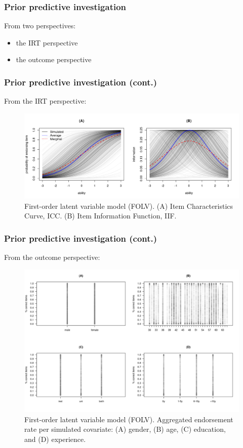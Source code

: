\documentclass[nonav,sleutel]{beamer}
\begin{document}
	\begin{frame}
		\frametitle{Prior predictive investigation}
		From two perspectives:
		\begin{itemize}
			\item the IRT perspective
			\item the outcome perspective
		\end{itemize}
	\end{frame}
	\begin{frame}
		\frametitle{Prior predictive investigation (cont.)}
		From the IRT perspective:
		\begin{figure}[H]
			\centering
			\includegraphics[width=1\linewidth]{FOLV_ICC_prior}
			\caption{First-order latent variable model (FOLV). (A) Item Characteristics Curve, ICC. (B) Item Information Function, IIF.}
			\label{fig:FOLV_ICC_prior}
		\end{figure} 
	\end{frame}
	\begin{frame}
		\frametitle{Prior predictive investigation (cont.)}
		From the outcome perspective:
		\begin{figure}[h]
			\centering
			\includegraphics[width=0.65\linewidth]{FOLV_HitRate2}
			\caption{First-order latent variable model (FOLV). Aggregated endorsement rate per simulated covariate: (A) gender, (B) age, (C) education, and (D) experience.}
			\label{fig:FOLV_hitrate2}
		\end{figure}
	\end{frame}
\end{document}
